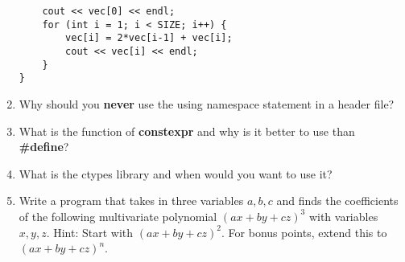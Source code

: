 \documentclass[12pt,letterpaper]{article}
\begin{document}
\begin{enumerate}
\begin{lstlisting}
    cout << vec[0] << endl;
    for (int i = 1; i < SIZE; i++) {
        vec[i] = 2*vec[i-1] + vec[i];
        cout << vec[i] << endl;
    }
}

    \end{lstlisting}
    
    \item Why should you \textbf{never} use the using namespace statement in a header file?
    
    \vspace{20mm}
    
    \item What is the function of \textbf{constexpr} and why is it better to use than \textbf{\#define}?
    
    \vspace{20mm}
    
    \item What is the ctypes library and when would you want to use it?
    
    \vspace{20mm}
    
    \item Write a program that takes in three variables $a,b,c$ and finds the coefficients of the following multivariate polynomial $(ax + by + cz)^3$ with variables $x, y, z$.  Hint: Start with 
    $(ax+by+cz)^2$.  For bonus points, extend this to $(ax+by+cz)^n$.
    
\end{enumerate}
\end{document}

